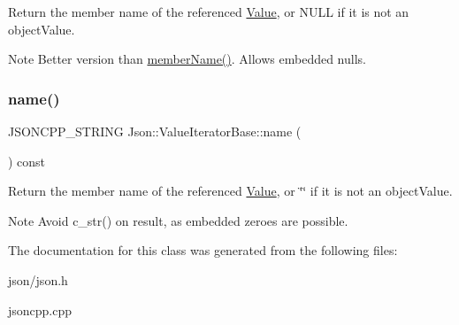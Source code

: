 Return the member name of the referenced \hyperlink{classJson_1_1Value}{Value}, or N\+U\+LL if it is not an object\+Value. \begin{DoxyNote}{Note}
Better version than \hyperlink{classJson_1_1ValueIteratorBase_a54765da6759fd3f1edcbfbaf308ec263}{member\+Name()}. Allows embedded nulls. 
\end{DoxyNote}
\mbox{\label{classJson_1_1ValueIteratorBase_a522989403c976fdbb94da846b99418db}} 
\subsubsection{\texorpdfstring{name()}{name()}}
{\footnotesize\ttfamily J\+S\+O\+N\+C\+P\+P\+\_\+\+S\+T\+R\+I\+NG Json\+::\+Value\+Iterator\+Base\+::name (\begin{DoxyParamCaption}{ }\end{DoxyParamCaption}) const}

Return the member name of the referenced \hyperlink{classJson_1_1Value}{Value}, or \char`\"{}\char`\"{} if it is not an object\+Value. \begin{DoxyNote}{Note}
Avoid {\ttfamily c\+\_\+str()} on result, as embedded zeroes are possible. 
\end{DoxyNote}


The documentation for this class was generated from the following files\+:\begin{DoxyCompactItemize}
\item 
json/json.\+h\item 
jsoncpp.\+cpp\end{DoxyCompactItemize}
